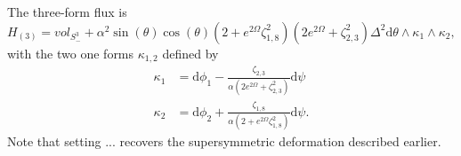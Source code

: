 \documentclass[a4paper, 11pt]{article}
\numberwithin{equation}{section}
\newcommand{\+}{\oplus}
\renewcommand{\d}{\ensuremath{\mathrm{d}}\xspace}
\begin{document}
The three-form flux is 
\begin{equation}
	H_{(3)}=vol_{S_-^3}+\alpha ^2\sin(\theta)\cos (\theta)(2+e^{2\Omega}\zeta^2_{1,8})(2e^{2\Omega}+\zeta_{2,3}^2)\Delta^2\mathrm{d}\theta\wedge\kappa_1\wedge\kappa_2,
\end{equation}
with the two one forms $\kappa_{1,2}$ defined by 
\begin{equation}
\begin{split}
		\kappa_1&=\mathrm{d}\phi_1-\frac{\zeta_{2,3}}{\alpha(2e^{2\Omega}+\zeta_{2,3}^2)}\mathrm{d}\psi \\
	\kappa_2&=\mathrm{d}\phi_2+ \frac{\zeta_{1,8}}{\alpha(2+e^{2\Omega}\zeta_{1,8}^2)}\mathrm{d}\psi.
\end{split}
\end{equation}
Note that setting $...$ recovers the supersymmetric deformation described earlier.
\end{document}
